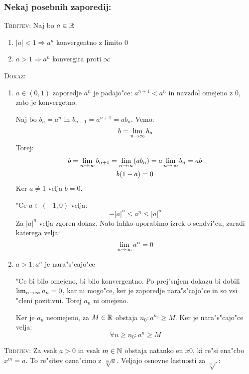 \subsubsection*{Nekaj posebnih zaporedij:}
\textsc{Trditev:} Naj bo $a \in \mathbb{R}$
\begin{enumerate}[1)]
	\item $|a| < 1 \Rightarrow a^n$ konvergentno z limito 0
	\item $a > 1 \Rightarrow a^n$ konvergira proti $\infty$
\end{enumerate}
\textsc{Dokaz:}
\begin{enumerate}[1)]
	\item $a \in (0, 1)$ zaporedje $a^n$ je padajo"ce: $a^{n+1} < a^n$ in navzdol omejeno z 0, zato je konvergetno.
	
	Naj bo $b_n = a^n$ in $b_{n+1} = a^{n+1} = ab_n$. Vemo:
	\begin{equation*}
	b = \lim_{n \rightarrow \infty} b_n
	\end{equation*}
	Torej:
	\begin{gather*}
	b = \lim_{n \rightarrow \infty} b_{n+1} = \lim_{n \rightarrow \infty} (ab_n) = a \lim_{n \rightarrow \infty} b_n = ab \\
	b(1-a) = 0
	\end{gather*}
	Ker $a \neq 1$ velja $b = 0$.
	
	"Ce $a \in (-1, 0)$ velja:
	\begin{equation*}
	- |a|^n \leq a^n \leq |a|^n 
	\end{equation*}
	Za $|a|^n$ velja zgoren dokaz. Nato lahko uporabimo izrek o sendvi"cu, zaradi katerega velja:
	\begin{equation*}
	\lim_{n \rightarrow \infty} a^n = 0
	\end{equation*}
	
	\item $a > 1: a^n$ je nara"s"cajo"ce
	
	"Ce bi bilo omejeno, bi bilo konvergentno. Po prej"snjem dokazu bi dobili $\lim_{n \rightarrow \infty} a_n = 0$, kar ni mogo"ce, ker je zaporedje nara"s"cajo"ce in so vsi "cleni pozitivni. Torej $a_n$ ni omejeno.
	
	
	Ker je $a_n$ neomejeno, za $M \in \mathbb{R}$ obstaja $n_0: a^{n_0} \geq M$. Ker je nara"s"cajo"ce velja:
	\begin{equation*}
	\forall n \geq n_0: a^n \geq M
	\end{equation*}
\end{enumerate}
%
\textsc{Trditev:} Za vsak $a > 0$ in vsak $m \in \mathbb{N}$ obstaja natanko en $x  0$, ki re"si ena"cbo $x^m = a$. To re"sitev ozna"cimo z $\sqrt[m]{a}$. Veljajo osnovne lastnosti za $\sqrt[m]{~}$:

